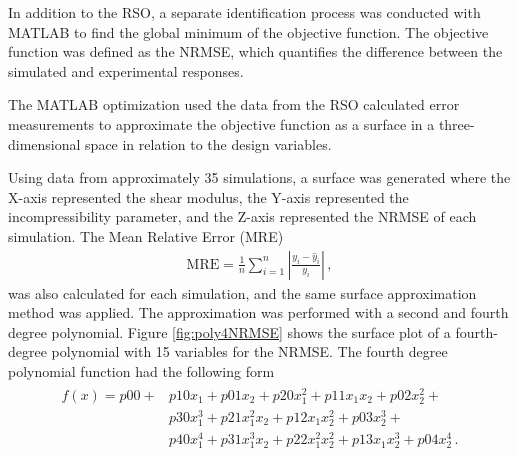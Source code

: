 In addition to the RSO, a separate identification process was conducted with MATLAB to find the global minimum of 
the objective function. The objective function was defined as the NRMSE, which quantifies the difference 
between the simulated and experimental responses.

The MATLAB optimization used the data from the RSO calculated error measurements to approximate 
the objective function as a surface in a three-dimensional space in relation to the design variables. 

Using data from approximately \SI{35}{} simulations, a surface was generated where the X-axis represented the shear 
modulus, the Y-axis represented the incompressibility parameter, and the Z-axis represented the NRMSE 
of each simulation. The Mean Relative Error (MRE) 
\begin{align}
	\text{MRE} = \frac{1}{n} \sum_{i=1}^{n} \left| \frac{y_i - \hat{y}_i}{y_i} \right| \, ,
    \label{eq:mre}
\end{align}
was also calculated for each simulation, and the same surface approximation method was applied. 
The approximation was performed with a second and fourth degree polynomial.
Figure \ref{fig:poly4NRMSE}
shows the surface plot of a fourth-degree polynomial with \SI{15}{} variables for the NRMSE. 
The fourth degree polynomial function had the following form
\begin{align}
	\begin{split}
	f(x) = p00 + &p10x_1 + p01x_2 + p20x_1^2 + p11x_1x_2 + p02x_2^2 + \\
	&p30x_1^3 + p21x_1^2x_2 + p12x_1x_2^2 + p03x_2^3 + \\
	&p40x_1^4 + p31x_1^3x_2 + p22x_1^2x_2^2 + p13x_1x_2^3 + p04x_2^4 \,.
	\end{split}
\end{align}
